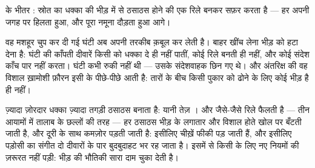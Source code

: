 \begin{omfigure}

{\small {} के भीतर : स्रोत का धक्का  की भीड़ में से
ठसाठस होने की एक रिले बनकर सफ़र करता है --- हर  अपनी जगह पर हिलता
हुआ, और पूरा नमूना दौड़ता हुआ आगे।}
\end{omfigure}

\begin{example}[मर्तबान, आख़िरकार समझाया हुआ]\label{ex:g7:sound-production:jar}
वह मशहूर चुप कर दी गई घंटी अब अपनी तरकीब क़बूल कर लेती है।  बाहर
खींच लेना भीड़ को हटा देना है: घंटी की काँपती दीवारें किसी को धक्का
दे ही नहीं पातीं, कोई रिले बनती ही नहीं, और कोई संदेश काँच पार नहीं
करता। घंटी कभी रुकी नहीं थी --- उसके संदेशवाहक छिन गए थे। और अंतरिक्ष
की वह विशाल ख़ामोशी फ़ौरन इसी के पीछे-पीछे आती है: तारों के बीच किसी
पुकार को ढोने के लिए कोई भीड़ है ही नहीं।
\end{example}

\begin{example}[तेज़, धीमी, और थकी हुई]\label{ex:g7:sound-production:loud}
ज़्यादा ज़ोरदार धक्का ज़्यादा तगड़ी ठसाठस बनाता है: यानी तेज़ ।
और जैसे-जैसे रिले फैलती है --- तीन आयामों में तालाब के छल्लों की तरह
--- हर ठसाठस भीड़ के लगातार और विशाल होते खोल पर बँटती जाती है, और
दूरी के साथ कमज़ोर पड़ती जाती है: इसीलिए चीख़ें फीकी पड़ जाती हैं, और
इसीलिए पड़ोसी का संगीत दो दीवारों के पार बुदबुदाहट भर रह जाता है। इसमें
से किसी के लिए नए नियमों की ज़रूरत नहीं पड़ी: भीड़ की भौतिकी सारा दाम
चुका देती है।
\end{example}

